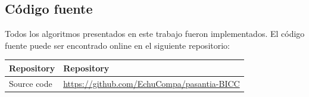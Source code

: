 


\subsection{Código fuente}

Todos los algoritmos presentados en este trabajo fueron implementados. El código fuente puede ser encontrado online en el siguiente repositorio: 

\begin{table}[H]
\centering
\begin{tabular}{ll}
\toprule
\textbf{Repository} & \textbf{Repository} \\
\midrule
Source code & \url{https://github.com/EchuCompa/pasantia-BICC} \\
\end{tabular}
\end{table}
